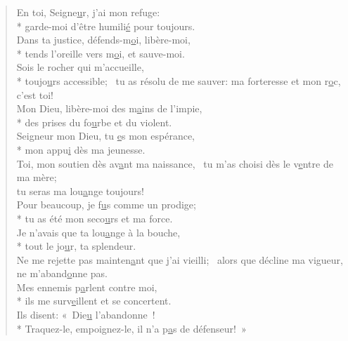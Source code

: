 \begin{verse}
En toi, Seigne\underline{u}r, j’ai mon refuge: \\*
garde-moi d’être humili\underline{é} pour toujours. \\
Dans ta justice, défends-m\underline{o}i, libère-moi, \\*
tends l’oreille vers m\underline{o}i, et sauve-moi. \\

Sois le rocher qui m’accueille, \\*
toujo\underline{u}rs accessible;~\psalmstar
tu as résolu de me sauver:
ma forteresse et mon r\underline{o}c, c’est toi! \\

Mon Dieu, libère-moi des m\underline{a}ins de l’impie, \\*
des prises du fo\underline{u}rbe et du violent. \\
Seigneur mon Dieu, tu \underline{e}s mon espérance, \\*
mon appu\underline{i} dès ma jeunesse. \\

Toi, mon soutien dès av\underline{a}nt ma naissance,~\psalmdagger
tu m’as choisi dès le v\underline{e}ntre de ma mère; \\
tu seras ma lou\underline{a}nge toujours! \\

Pour beaucoup, je f\underline{u}s comme un prodige; \\*
tu as été mon seco\underline{u}rs et ma force. \\
Je n’avais que ta lou\underline{a}nge à la bouche, \\*
tout le jo\underline{u}r, ta splendeur. \\

Ne me rejette pas
mainten\underline{a}nt que j’ai vieilli;~\psalmstar
alors que décline ma vigueur, \\
ne m’aband\underline{o}nne pas. \\

Mes ennemis p\underline{a}rlent contre moi, \\*
ils me surv\underline{e}illent et se concertent. \\
Ils disent: « Die\underline{u} l’abandonne ! \\*
Traquez-le, empoignez-le, il n’a p\underline{a}s de défenseur! » \\


\end{verse}
